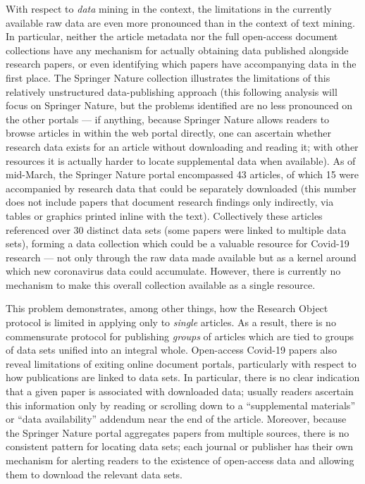 \documentclass[11pt,letterpaper]{article}
\newcommand{\textscc}[1]{{\color{orr!35!black}{{%
						\fontfamily{Cabin-TLF}\fontseries{b}\selectfont{\textsc{\scriptsize{#1}}}}}}}
\newcommand{\AcronymText}[1]{{\textscc{#1}}}
\newcommand{\Cnineteen}{\resizebox{!}{7pt}{\AcronymText{CORD-19}}}
\newcommand{\HTML}{\resizebox{!}{7pt}{\AcronymText{HTML}}}
\newcommand{\p}[1]{

\vspace{.85em}#1}
\newcommand{\q}[1]{{\fontfamily{qcr}\selectfont ``}#1{\fontfamily{qcr}\selectfont ''}}
\begin{document}
\p{With respect to \textit{data} mining in the \Cnineteen{} 
context, the limitations in the currently available raw 
\Cnineteen{} data are even more pronounced than in the 
context of text mining.  In particular, 
neither the article 
metadata nor the full open-access document collections have 
any mechanism for actually obtaining data published 
alongside research papers, or even identifying which papers 
have accompanying data in the first place.  The Springer 
Nature collection illustrates the limitations of this relatively unstructured 
data-publishing approach (this following analysis will 
focus on Springer Nature, but the problems identified 
are no less pronounced on the other \Cnineteen{} portals 
--- 
if anything, because Springer Nature 
allows readers to browse articles in \HTML{} within the 
web portal directly, one can ascertain whether research data 
exists for an article without downloading and reading 
it; with other \Cnineteen{} resources it is actually 
harder to locate supplemental data when available).  As of mid-March, the Springer Nature portal 
encompassed 43 articles, 
of which 15 were accompanied by research data that 
could be separately downloaded (this number does 
not include papers that document research 
findings only indirectly, via tables or graphics 
printed inline with the text).  Collectively 
these articles referenced over 30 distinct data 
sets (some papers were linked to multiple 
data sets), forming a data collection which could 
be a valuable resource for Covid-19 research --- 
not only through the raw data made available 
but as a kernel around which new coronavirus data 
could accumulate.  However, there is currently no 
mechanism to make this overall collection available 
as a single resource.}

\p{This problem demonstrates, among other things, 
how the Research Object protocol is limited in applying 
only to \textit{single} articles.  As a result, there is no 
commensurate protocol for publishing \textit{groups} 
of articles which are tied to groups of data sets unified 
into an integral whole.  Open-access Covid-19 papers also 
reveal limitations of exiting online document portals, 
particularly with respect to how publications are 
linked to data sets.  In particular, there is no clear indication that a 
given paper is associated with downloaded data; usually 
readers ascertain this information only by reading or 
scrolling down to a \q{supplemental materials} or 
\q{data availability} addendum near the end of the article.  
Moreover, because the Springer Nature portal aggregates 
papers from multiple sources, there is no consistent 
pattern for locating data sets; each journal or 
publisher has their own mechanism for alerting readers 
to the existence of open-access data and allowing them 
to download the relevant data sets.}
\end{document}
